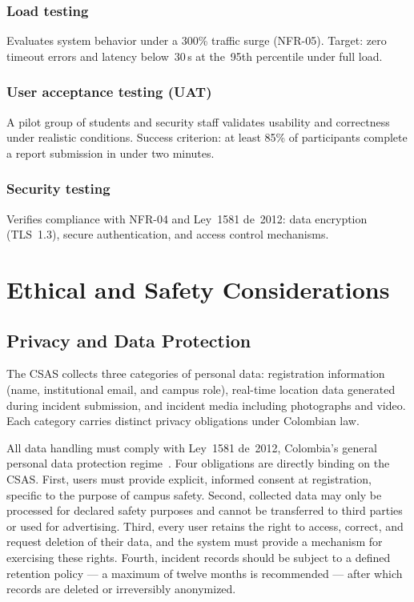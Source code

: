 \documentclass[10pt,twocolumn]{article}
\begin{document}
\subsubsection{Load testing}
Evaluates system behavior under a 300\% traffic surge (NFR-05).
Target: zero timeout errors and latency below~30\,s at the~95th
percentile under full load.

\subsubsection{User acceptance testing (UAT)}
A pilot group of students and security staff validates usability and
correctness under realistic conditions. Success criterion: at least 85\%
of participants complete a report submission in under two minutes.

\subsubsection{Security testing}
Verifies compliance with NFR-04 and Ley~1581 de~2012: data encryption
(TLS~1.3), secure authentication, and access control mechanisms.

\section{Ethical and Safety Considerations}

\subsection{Privacy and Data Protection}

The CSAS collects three categories of personal data: registration
information (name, institutional email, and campus role), real-time
location data generated during incident submission, and incident media
including photographs and video. Each category carries distinct privacy
obligations under Colombian law.

All data handling must comply with Ley~1581 de~2012, Colombia's general
personal data protection regime~\cite{ley1581}. Four obligations are
directly binding on the CSAS. First, users must provide explicit,
informed consent at registration, specific to the purpose of campus
safety. Second, collected data may only be processed for declared safety
purposes and cannot be transferred to third parties or used for
advertising. Third, every user retains the right to access, correct, and
request deletion of their data, and the system must provide a mechanism
for exercising these rights. Fourth, incident records should be subject
to a defined retention policy --- a maximum of twelve months is
recommended --- after which records are deleted or irreversibly
anonymized.
\end{document}
